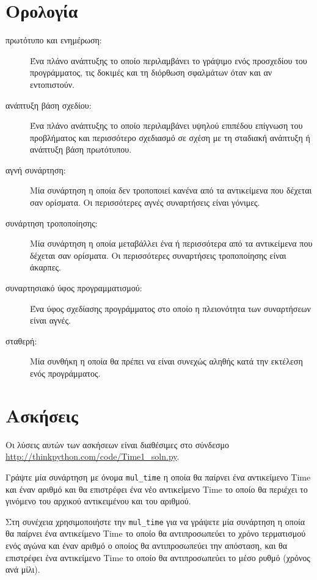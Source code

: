 \documentclass[10pt]{book}
\begin{document}
\section{Ορολογία}

\begin{description}

\item[πρωτότυπο και ενημέρωση:] Ένα πλάνο ανάπτυξης το οποίο περιλαμβάνει το γράψιμο ενός προσχεδίου του προγράμματος, τις δοκιμές και τη διόρθωση σφαλμάτων όταν και αν εντοπιστούν.

\item[ανάπτυξη βάση σχεδίου:] Ένα πλάνο ανάπτυξης το οποίο περιλαμβάνει υψηλού επιπέδου επίγνωση του προβλήματος και 
περισσότερο σχεδιασμό σε σχέση με τη σταδιακή ανάπτυξη ή ανάπτυξη βάση πρωτότυπου.

\item[αγνή συνάρτηση:] Μία συνάρτηση η οποία δεν τροποποιεί κανένα από τα αντικείμενα που δέχεται σαν ορίσματα.  Οι περισσότερες αγνές συναρτήσεις είναι γόνιμες.

\item[συνάρτηση τροποποίησης:] Μία συνάρτηση η οποία μεταβάλλει ένα ή περισσότερα από τα αντικείμενα που δέχεται σαν ορίσματα.   
Οι περισσότερες συναρτήσεις τροποποίησης είναι άκαρπες.

\item[συναρτησιακό ύφος προγραμματισμού:] Ένα ύφος σχεδίασης προγράμματος στο οποίο η πλειονότητα των συναρτήσεων είναι αγνές.

\item[σταθερή:] Μία συνθήκη η οποία θα πρέπει να είναι συνεχώς αληθής κατά την εκτέλεση ενός προγράμματος.

\end{description}


\section{Ασκήσεις}

Οι λύσεις αυτών των ασκήσεων είναι διαθέσιμες στο
σύνδεσμο \url{http://thinkpython.com/code/Time1_soln.py}.
\\
\begin{exercise}

Γράψτε μία συνάρτηση με όνομα \verb"mul_time" η οποία θα παίρνει ένα αντικείμενο
Time και έναν αριθμό και θα επιστρέφει ένα νέο αντικείμενο Time το οποίο
θα περιέχει το γινόμενο του αρχικού αντικειμένου και του αριθμού.

Στη συνέχεια χρησιμοποιήστε την \verb"mul_time" για να γράψετε μία συνάρτηση η οποία θα παίρνει
ένα αντικείμενο Time το οποίο θα αντιπροσωπεύει το χρόνο τερματισμού ενός αγώνα και έναν αριθμό ο
οποίος θα αντιπροσωπεύει την απόσταση, και θα επιστρέφει ένα αντικείμενο Time το οποίο θα αντιπροσωπεύει
το μέσο ρυθμό (χρόνος ανά μίλι).
\\

\end{exercise}
\end{document}

